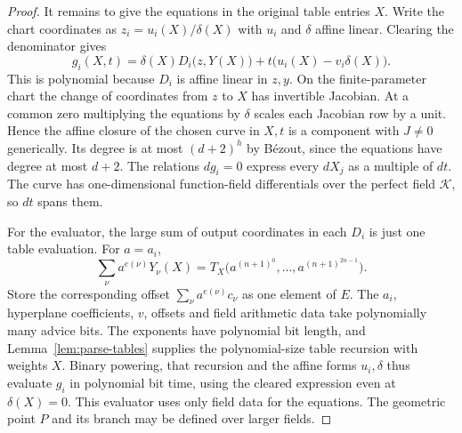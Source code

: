 \begin{proof}
It remains to give the equations in the original table entries $X$.
Write the chart coordinates as $z_i=u_i(X)/\delta(X)$ with $u_i$ and
$\delta$ affine linear. Clearing the denominator gives
\[
 g_i(X,t)=\delta(X) D_i\bigl(z,Y(X)\bigr)
                  +t\bigl(u_i(X)-v_i\delta(X)\bigr).
\]
This is polynomial because $D_i$ is affine linear in $z,y$. On the
finite-parameter chart the change of coordinates from $z$ to $X$ has
invertible Jacobian. At a common zero multiplying the equations by
$\delta$ scales each Jacobian row by a unit. Hence the affine closure
of the chosen curve in $X,t$ is a component with $J\ne0$ generically.
Its degree is at most $(d+2)^h$ by B\'ezout, since the equations have
degree at most $d+2$. The relations $dg_i=0$ express every $dX_j$ as
a multiple of $dt$. The curve has one-dimensional function-field
differentials over the perfect field $\mathcal K$, so $dt$ spans them.

For the evaluator, the large sum of output coordinates in each $D_i$
is just one table evaluation. For $a=a_i$,
\[
 \sum_\nu a^{e(\nu)}Y_\nu(X)
     =T_X\bigl(a^{(n+1)^0},\ldots,a^{(n+1)^{2n-1}}\bigr).
\]
Store the corresponding offset $\sum_\nu a^{e(\nu)}c_\nu$ as one
element of $E$. The $a_i$, hyperplane coefficients, $v$, offsets and
field arithmetic data take polynomially many advice bits. The exponents
have polynomial bit length, and Lemma~\ref{lem:parse-tables} supplies
the polynomial-size table recursion with weights $X$. Binary powering,
that recursion and the affine forms $u_i,\delta$ thus evaluate $g_i$
in polynomial bit time, using the cleared expression even at
$\delta(X)=0$. This evaluator uses only field data for the equations.
The geometric point $P$ and its branch may be defined over larger fields.
\end{proof}
